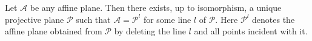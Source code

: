 Let $\mathcal{A}$ be any affine plane. Then there exists, up to isomorphism, a unique projective plane $\mathcal{P}$ such that $\mathcal{A} = \mathcal{P}^l$ for some line $l$ of $\mathcal{P}$. Here $\mathcal{P}^l$ denotes the affine plane obtained from $\mathcal{P}$ by deleting the line $l$ and all points incident with it.
